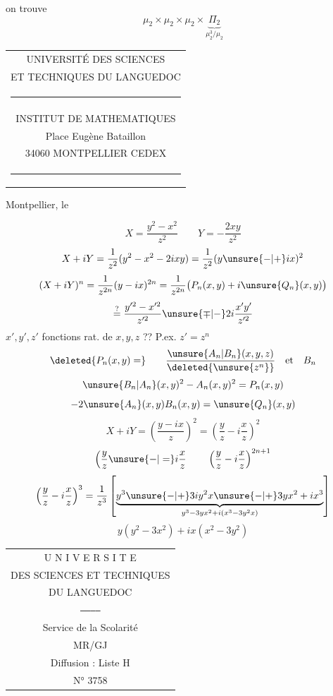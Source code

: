 on trouve
\[
\mu_2\times\mu_2\times\mu_2\times
\underset{\mu_2^3/\mu_2}{\underbrace{\Pi_2}}
\]

\begin{tabular}{c}
UNIVERSITÉ DES SCIENCES\\
ET TECHNIQUES DU LANGUEDOC\\
\rule{1cm}{.3pt}\\
INSTITUT DE MATHEMATIQUES\\
Place Eugène Bataillon\\
34060 MONTPELLIER CEDEX\\
\rule{1cm}{.3pt}
\end{tabular}

Montpellier, le

\[X=\frac{y^2-x^2}{z^2}\qquad Y=-\frac{2xy}{z^2}\]
\[
X+iY=\frac1{z^2}(y^2-x^2-2ixy)=\frac1{z^2}(y\unsure{-|+}ix)^2
\]
\[
(X+iY)^n=\frac1{z^{2n}}(y-ix)^{2n}=\frac1{z^{2n}}\bigl(P_n(x,y)+i\unsure{Q_n}(x,y)\bigr)
\]
\[
\stackrel{?}{=}\frac{y'^2-x'^2}{z'^2}\unsure{\mp|-}2i\frac{x'y'}{z'^2}
\]
$x',y',z'$ fonctions rat. de $x,y,z$ ?? P.ex. $z'=z^n$
\[
\deleted{P_n(x,y)=}\qquad\frac{\unsure{A_n|B_n}(x,y,z)}{\deleted{\unsure{z^n}}}\quad\text{et}\quad B_n
\]
\[
\unsure{B_n|A_n}(x,y)^2-A_n(x,y)^2=P_n(x,y)
\]
\[
-2\unsure{A_n}(x,y)B_n(x,y)=\unsure{Q_n}(x,y)
\]
\[
X+iY=\left(\frac{y-ix}{z}\right)^2=\left(\frac yz-i\frac xz\right)^2
\]
\[
\left(\frac yz\unsure{-|=}i\frac xz\right.
\qquad
\left(\frac yz-i\frac xz\right)^{2n+1}
\]
\[
\left(\frac yz-i\frac xz\right)^3
=\frac1{z^3}\left[
\underbrace{y^3\unsure{-|+}3iy^2x\unsure{-|+}3yx^2+ix^3}_{y^3-3yx^2+i(x^3-3y^2x)}
\right]
\]
\[
y(y^2-3x^2)+ix(x^2-3y^2)
\]

\begin{tabular}{c}
U N I V E R S I T E\\
DES SCIENCES ET TECHNIQUES\\
DU LANGUEDOC\\
\texttt{------------}\\
Service de la Scolarité\\
MR/GJ\\
Diffusion : Liste H\\
N° 3758
\end{tabular}

